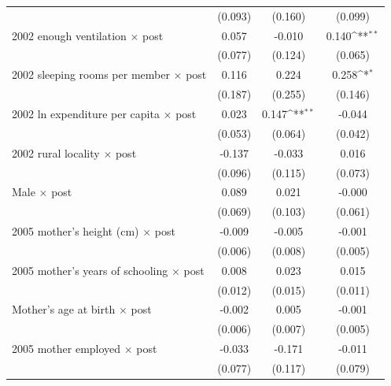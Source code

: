 \documentclass[12pt]{article}
\def\sym#1{\ifmmode^{#1}\else\(^{#1}\)\fi}
\begin{document}
\begin{table}[!htbp]
{\begin{tabular}{p{}ccc}
            &     (0.093)         &     (0.160)         &     (0.099)         \\
2002 enough ventilation \ensuremath{\times} post&       0.057         &      -0.010         &       0.140\sym{**} \\
            &     (0.077)         &     (0.124)         &     (0.065)         \\
2002 sleeping rooms per member \ensuremath{\times} post&       0.116         &       0.224         &       0.258\sym{*}  \\
            &     (0.187)         &     (0.255)         &     (0.146)         \\
2002 ln expenditure per capita \ensuremath{\times} post&       0.023         &       0.147\sym{**} &      -0.044         \\
            &     (0.053)         &     (0.064)         &     (0.042)         \\
2002 rural locality \ensuremath{\times} post&      -0.137         &      -0.033         &       0.016         \\
            &     (0.096)         &     (0.115)         &     (0.073)         \\
Male \ensuremath{\times} post&       0.089         &       0.021         &      -0.000         \\
            &     (0.069)         &     (0.103)         &     (0.061)         \\
2005 mother's height (cm) \ensuremath{\times} post&      -0.009         &      -0.005         &      -0.001         \\
            &     (0.006)         &     (0.008)         &     (0.005)         \\
2005 mother's years of schooling \ensuremath{\times} post&       0.008         &       0.023         &       0.015         \\
            &     (0.012)         &     (0.015)         &     (0.011)         \\
Mother's age at birth \ensuremath{\times} post&      -0.002         &       0.005         &      -0.001         \\
            &     (0.006)         &     (0.007)         &     (0.005)         \\
2005 mother employed \ensuremath{\times} post&      -0.033         &      -0.171         &      -0.011         \\
            &     (0.077)         &     (0.117)         &     (0.079)         \\

\end{tabular}}
\end{table}
\end{document}
